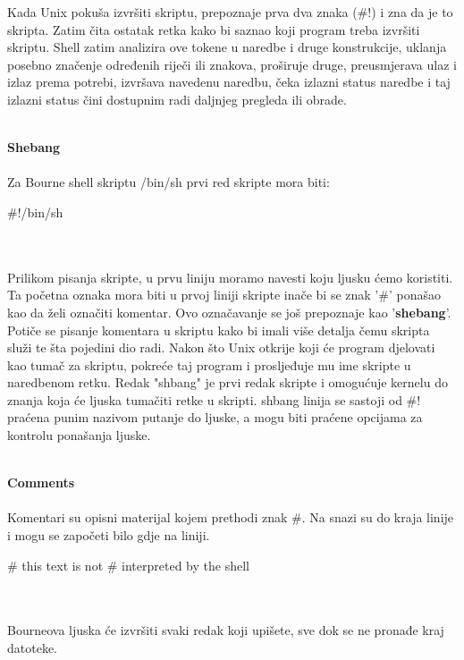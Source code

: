 \documentclass[11pt]{book}
\begin{document}
Kada Unix pokuša izvršiti skriptu, prepoznaje prva dva znaka (\#!) i zna da je to skripta. Zatim čita ostatak retka kako bi saznao koji program treba izvršiti skriptu. Shell zatim analizira ove tokene u naredbe i druge konstrukcije, uklanja posebno značenje određenih riječi ili znakova, proširuje druge, preusmjerava ulaz i izlaz prema potrebi, izvršava navedenu naredbu, čeka izlazni status naredbe i taj izlazni status čini dostupnim radi daljnjeg pregleda ili obrade.\\\\
\par\textbf{Shebang}\\\\
Za Bourne shell skriptu /bin/sh prvi red skripte mora biti:
\begin{shortlisting}
#!/bin/sh
\end{shortlisting}\\\\
Prilikom pisanja skripte, u prvu liniju moramo navesti koju ljusku ćemo koristiti. Ta početna oznaka mora biti u prvoj liniji skripte inače bi se znak '\#' ponašao kao da želi označiti komentar. Ovo označavanje se još prepoznaje kao '\textbf{shebang}'. Potiče se pisanje komentara u skriptu kako bi imali više detalja čemu skripta služi te šta pojedini dio radi.
Nakon što Unix otkrije koji će program djelovati kao tumač za skriptu, pokreće taj program i prosljeđuje mu ime skripte u naredbenom retku.
Redak "shbang" je prvi redak skripte i omogućuje kernelu do znanja koja će ljuska tumačiti retke u skripti. shbang linija se sastoji od \#! praćena punim nazivom putanje do ljuske, a mogu biti praćene opcijama za kontrolu ponašanja ljuske.\\\\
\par\textbf{Comments}\\\\
Komentari su opisni materijal kojem prethodi znak \#. Na snazi su do kraja linije i mogu se započeti bilo gdje na liniji.
\begin{shortlisting}
# this text is not
# interpreted by the shell 
\end{shortlisting}\\\\
Bourneova ljuska će izvršiti svaki redak koji upišete, sve dok se ne pronađe kraj datoteke.\\\\
\end{document}
